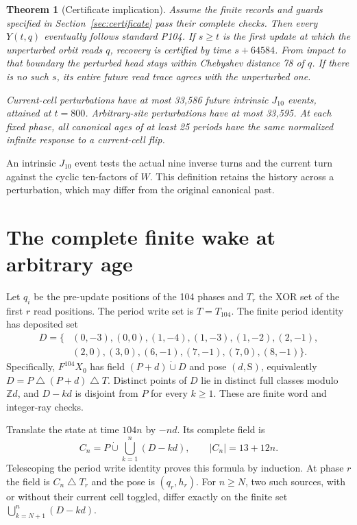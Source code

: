 \documentclass[11pt]{article}
\newtheorem{theorem}{Theorem}[section]
\newcommand{\Z}{\mathbb Z}\newcommand{\N}{\mathbb N}
\newcommand{\xor}{\mathbin{\triangle}}
\begin{document}
\begin{theorem}[Certificate implication]\label{thm:recovery}
Assume the finite records and guards specified in Section~\ref{sec:certificate}
pass their complete checks. Then every $Y(t,q)$ eventually follows standard
P104. If $s\ge t$ is the first update at which the unperturbed orbit reads
$q$, recovery is certified by time $s+64584$. From impact to that boundary
the perturbed head stays within Chebyshev distance 78 of $q$. If there is
no such $s$, its entire future read trace agrees with the unperturbed one.

Current-cell perturbations have at most 33,586 future intrinsic $J_{10}$
events, attained at $t=800$. Arbitrary-site perturbations have at most 33,595.
At each fixed phase, all canonical ages of at least 25 periods have the same
normalized infinite response to a current-cell flip.
\end{theorem}
An intrinsic $J_{10}$ event tests the actual nine inverse turns and the current
turn against the cyclic ten-factors of $W$. This definition retains the history
across a perturbation, which may differ from the original canonical past.

\section{The complete finite wake at arbitrary age}
Let $q_i$ be the pre-update positions of the 104 phases and $T_r$ the XOR set
of the first $r$ read positions. The period write set is $T=T_{104}$. The
finite period identity has deposited set
\[
\begin{split}
 D=\{&(0,-3),(0,0),(1,-4),(1,-3),(1,-2),(2,-1),\\
     &(2,0),(3,0),(6,-1),(7,-1),(7,0),(8,-1)\}.
\end{split}
\]
Specifically, $F^{104}X_0$ has field $(P+d)\mathbin{\dot\cup}D$ and pose
$(d,\mathrm S)$, equivalently $D=P\xor(P+d)\xor T$. Distinct points of $D$
lie in distinct full classes modulo $\Z d$, and $D-kd$ is disjoint from $P$
for every $k\ge1$. These are finite word and integer-ray checks.

Translate the state at time $104n$ by $-nd$. Its complete field is
\begin{equation}\label{eq:source}
 C_n=P\mathbin{\dot\cup}\bigcup_{k=1}^n(D-kd),\qquad |C_n|=13+12n.
\end{equation}
Telescoping the period write identity proves this formula by induction.
At phase $r$ the field is $C_n\xor T_r$ and the pose is $(q_r,h_r)$.
For $n\ge N$, two such sources, with or without their current cell toggled,
differ exactly on the finite set $\bigcup_{k=N+1}^n(D-kd)$.
\end{document}
